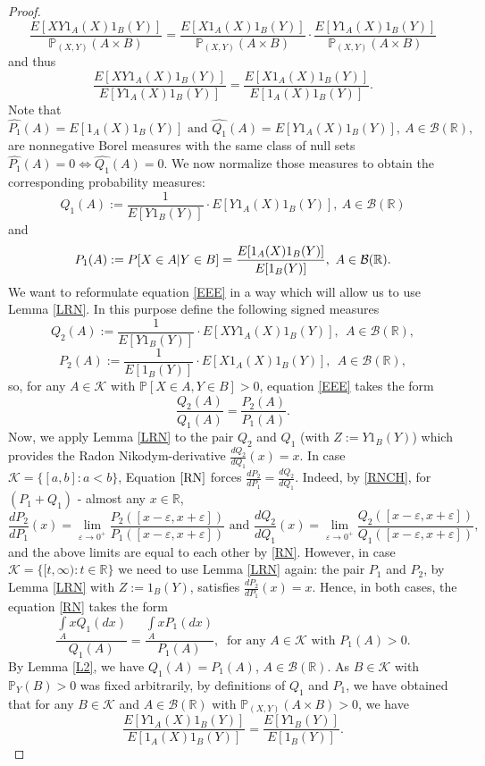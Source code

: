 \documentclass[sn-mathphys,Numbered,11pt]{sn-jnl}%
\theoremstyle{thmstyleone}%
\newcommand{\eps}{\varepsilon}
\newcommand{\R}{\mathbb{R}}
\newcommand{\PP}{\mathbb{P}}
\newcommand{\B}{\mathcal{B}(\R)}
\newcommand{\KK}{\mathcal{K}}
\begin{document}
\begin{proof}
$$\frac{E[XY1_A(X)1_B(Y)]}{\PP_{(X,Y)}(A\times B)}=\frac{E[X1_A(X)1_B(Y)]}{\PP_{(X,Y)}(A\times B)}\cdot \frac{E[Y1_A(X)1_B(Y)]}{\PP_{(X,Y)}(A\times B)}$$
and thus
\begin{equation}\label{EEE}
\frac{E[XY1_A(X)1_B(Y)]}{E[Y1_A(X)1_B(Y)]}=\frac{E[X1_A(X)1_B(Y)]}{E[1_A(X)1_B(Y)]}.
\end{equation}
 Note that 
$$\hat{P_1}(A)=E[1_A(X)1_B(Y)]\mbox{ and }\hat{Q_1}(A)= E[Y1_A(X)1_B(Y)],\ A\in\B,$$ are nonnegative Borel measures with the same class of null sets $\hat{P_1}(A)=0\Leftrightarrow\hat{Q_1}(A)=0$. We now normalize those measures to obtain the corresponding  probability measures:
$$Q_1(A):=\frac{1}{E[Y1_B(Y)]}\cdot E[Y1_A(X)1_B(Y)],\ A\in \B$$
and
$$P_1(A):=\\P[X\in A| Y\in B]=\frac{E[1_A(X)1_B(Y)]}{E[1_B(Y)]},\ A\in \B.$$
 We want to reformulate  equation \eqref{EEE} in a way which will allow us to use Lemma \ref{LRN}. In this purpose define the following signed measures
$$Q_2(A):= \frac{1}{E[Y1_B(Y)]}\cdot{E[XY1_A(X)1_B(Y)]},\ \ A\in\B,$$
$$P_2(A):=\frac{1}{E[1_B(Y)]}\cdot E[X1_A(X)1_B(Y)], \ \ A\in\B,$$
so,  for any $A\in\KK$ with $\PP[X\in A,Y\in B]>0$, equation \eqref{EEE} takes the form
\begin{equation}\label{RN}
\frac{Q_2(A)}{Q_1(A)}=\frac{P_2(A)}{P_1(A)}.
\end{equation}
Now, we apply Lemma \ref{LRN}  to the pair $Q_2$ and $Q_1$ (with $Z:=Y1_B(Y)$)  which provides  the Radon Nikodym-derivative $\frac{dQ_2}{dQ_1}(x)=x$. In case $\KK=\{[a,b]\colon a<b\}$, Equation $\eqref{RN}$ forces $\frac{dP_2}{dP_1}=\frac{dQ_2}{dQ_1}$. Indeed, by  \eqref{RNCH},  for  $(P_1+Q_1)$ - almost any $x\in\R$,
$$\frac{dP_2}{dP_1}(x)=\lim\limits_{\eps\to0^+}\frac{P_2([x-\eps,x+\eps])}{P_1([x-\eps,x+\eps])}\mbox{ and }\frac{dQ_2}{dQ_1}(x)=\lim\limits_{\eps\to0^+}\frac{Q_2([x-\eps,x+\eps])}{Q_1([x-\eps,x+\eps])},$$
and the above limits are equal to each other by \eqref{RN}. However,  in case $\KK=\{[t,\infty)\colon t\in\R\}$ we need to use Lemma \ref{LRN} again:  the pair $P_1$ and $P_2$, by Lemma \ref{LRN} with $Z:=1_B(Y)$, satisfies  $\frac{dP_2}{dP_1}(x)=x$. Hence, in both cases, the equation \eqref{RN} takes the form 
$$\frac{\int\limits_AxQ_1(dx)}{Q_1(A)}=\frac{\int\limits_AxP_1(dx)}{P_1(A)},\ \mbox{ for any } A\in\KK\mbox{ with }P_1(A)>0.$$
By Lemma \ref{L2}, we have $Q_1(A)=P_1(A)$, $A\in \B$. As $B\in\KK$ with $\PP_Y(B)>0$ was fixed arbitrarily, by definitions of $Q_1$ and $P_1$, we have obtained that for any $B\in\KK$ and  $A\in\B$ with $\PP_{(X,Y)}(A\times B)>0$, we have 
$$\frac{E[Y1_A(X)1_B(Y)]}{E[1_A(X)1_B(Y)]}=\frac{E[Y1_B(Y)]}{E[1_B(Y)]}.$$


\end{proof}
\end{document}
